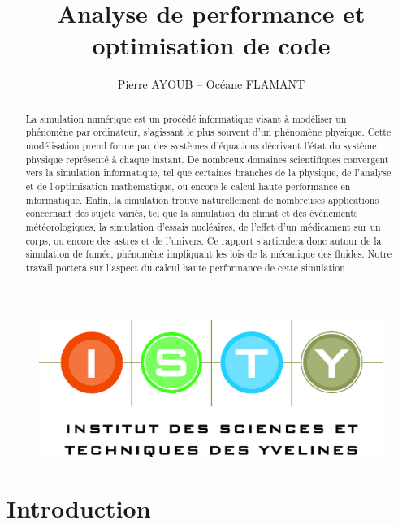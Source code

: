 \documentclass[12pt,a4paper]{article}
\begin{document}
\title{Analyse de performance et optimisation de code}
\author{Pierre AYOUB -- Océane FLAMANT}

\maketitle

\begin{figure}[b]
    \centering
    \includegraphics[scale=0.3]{figures/isty.jpg}
\end{figure}

\newpage
\begin{abstract}

La simulation numérique est un procédé informatique visant à modéliser un
phénomène par ordinateur, s'agissant le plus souvent d'un phénomène
physique. Cette modélisation prend forme par des systèmes d'équations
décrivant l'état du système physique représenté à chaque instant. De
nombreux domaines scientifiques convergent vers la simulation
informatique, tel que certaines branches de la physique, de l'analyse
et de l'optimisation mathématique, ou encore le calcul haute
performance en informatique. Enfin, la simulation trouve naturellement
de nombreuses applications concernant des sujets variés, tel que la
simulation du climat et des évènements météorologiques, la simulation
d'essais nucléaires, de l'effet d'un médicament sur un corps, ou encore
des astres et de l'univers. Ce rapport s'articulera donc autour de la
simulation de fumée, phénomène impliquant les lois de la mécanique des
fluides. Notre travail portera sur l'aspect du calcul haute performance
de cette simulation.

\end{abstract}

\tableofcontents

\section{Introduction}
\label{sec.intro}
\end{document}
